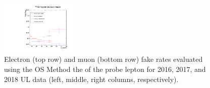 \begin{figure}[!htbp]
\begin{center}
		\includegraphics[width=0.32\textwidth]{figures/higgsmassmeas/redbkg/fr/fakerates_UL2018_mu.pdf}
		\caption{
			Electron (top row) and muon (bottom row) fake rates evaluated using the OS Method
			\vs the \pt of the probe lepton
			for 2016, 2017, and 2018 UL data (left, middle, right columns, respectively).
		}
		\label{fr_plots}
	\end{center}
\end{figure}

